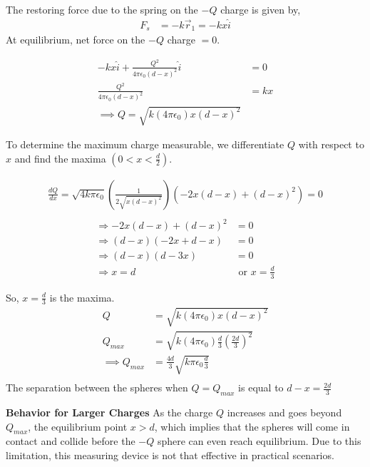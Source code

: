\documentclass[12pt]{article}
\providecommand{\brak}[1]{\ensuremath{\left(#1\right)}}
\begin{document}
The restoring force due to the spring on the $-Q$ charge is given by,
\begin{align}
F_s &= -k\vec{r}_1 = -kx \hat{i}
\end{align}
At equilibrium, net force on the $-Q$ charge $= 0$.

\begin{align*}
    -kx\hat{i} + \frac{Q^2}{4\pi\epsilon_0 (d-x)^2} \hat{i} &= 0 \\
    \frac{Q^2}{4\pi\epsilon_0 (d-x)^2} &= kx \\
    \implies Q = \sqrt{k(4\pi\epsilon_0)x(d-x)^2}
\end{align*}

To determine the maximum charge measurable, we differentiate $Q$ with respect to $x$ and find the maxima $\brak{0 < x < \frac{d}{2}}$.

\begin{align*}
    \frac{dQ}{dx} = \sqrt{4k\pi\epsilon_0} \left( \frac{1}{2 \sqrt{x(d-x)^2}} \right) \left( -2x(d-x) + (d-x)^2 \right) = 0 \\
\end{align*}
\begin{align*}
\Rightarrow -2x(d-x) + (d-x)^2 &= 0 \\
\Rightarrow (d-x)(-2x + d - x) &= 0 \\
\Rightarrow (d-x)(d-3x) &= 0 \\
\Rightarrow x = d &\text{ or } x = \frac{d}{3}
\end{align*}

So, $x = \frac{d}{3}$ is the maxima. 
\begin{align*}
    Q &= \sqrt{k(4\pi\epsilon_0)x\brak{d-x}^2}\\
    Q_{max} &= \sqrt{k(4\pi\epsilon_0)\frac{d}{3}\brak{\frac{2d}{3}}^2}\\
    \implies Q_{max} &= \frac{4d}{3}\sqrt{k\pi\epsilon_0 \frac{d}{3}}\\
\end{align*}
The separation between the spheres when $Q = Q_{max}$ is equal to $d - x = \frac{2d}{3}$

\textbf{Behavior for Larger Charges}
\newline
As the charge $Q$ increases and goes beyond $Q_{max}$, the equilibrium point $x > d$, which implies that the spheres will come in contact and collide before the $-Q$ sphere can even reach equilibrium.
\newline
Due to this limitation, this measuring device is not that effective in practical scenarios.
\end{document}
